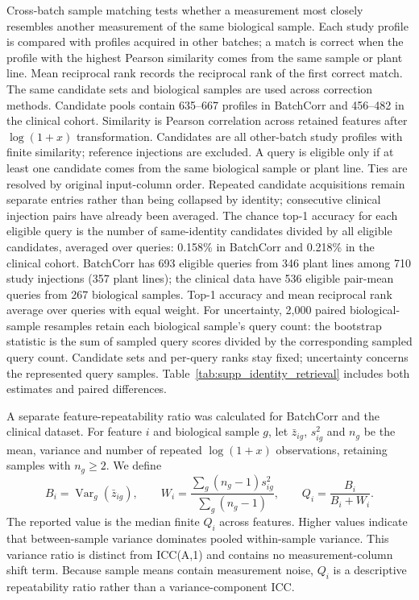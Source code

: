 \documentclass[namedate,webpdf,modern,large,nocrop]{oup-authoring-template}
\begin{document}
Cross-batch sample matching tests whether a measurement most closely resembles another measurement of the same biological sample. Each study profile is compared with profiles acquired in other batches; a match is correct when the profile with the highest Pearson similarity comes from the same sample or plant line. Mean reciprocal rank records the reciprocal rank of the first correct match. The same candidate sets and biological samples are used across correction methods. Candidate pools contain 635--667 profiles in BatchCorr and 456--482 in the clinical cohort. Similarity is Pearson correlation across retained features after $\log(1+x)$ transformation. Candidates are all other-batch study profiles with finite similarity; reference injections are excluded. A query is eligible only if at least one candidate comes from the same biological sample or plant line. Ties are resolved by original input-column order. Repeated candidate acquisitions remain separate entries rather than being collapsed by identity; consecutive clinical injection pairs have already been averaged. The chance top-1 accuracy for each eligible query is the number of same-identity candidates divided by all eligible candidates, averaged over queries: 0.158\% in BatchCorr and 0.218\% in the clinical cohort. BatchCorr has 693 eligible queries from 346 plant lines among 710 study injections (357 plant lines); the clinical data have 536 eligible pair-mean queries from 267 biological samples. Top-1 accuracy and mean reciprocal rank average over queries with equal weight. For uncertainty, 2,000 paired biological-sample resamples retain each biological sample's query count: the bootstrap statistic is the sum of sampled query scores divided by the corresponding sampled query count. Candidate sets and per-query ranks stay fixed; uncertainty concerns the represented query samples. Table~\ref{tab:supp_identity_retrieval} includes both estimates and paired differences.

A separate feature-repeatability ratio was calculated for BatchCorr and the clinical dataset. For feature \(i\) and biological sample \(g\), let \(\bar z_{ig}\), \(s^2_{ig}\) and \(n_g\) be the mean, variance and number of repeated \(\log(1+x)\) observations, retaining samples with \(n_g\geq2\). We define
\[
B_i=\operatorname{Var}_g(\bar z_{ig}),\qquad
W_i=\frac{\sum_g(n_g-1)s^2_{ig}}{\sum_g(n_g-1)},\qquad
Q_i=\frac{B_i}{B_i+W_i}.
\]
The reported value is the median finite \(Q_i\) across features. Higher values indicate that between-sample variance dominates pooled within-sample variance. This variance ratio is distinct from ICC(A,1) and contains no measurement-column shift term. Because sample means contain measurement noise, \(Q_i\) is a descriptive repeatability ratio rather than a variance-component ICC.
\end{document}
